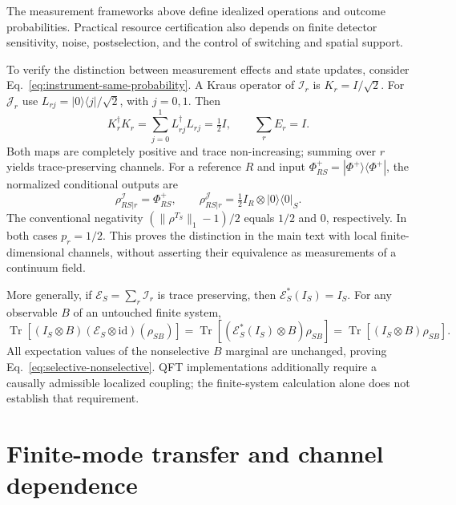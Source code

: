 \documentclass[pdflatex,sn-mathphys-num]{sn-jnl}
\newcommand{\Tr}{\operatorname{Tr}}
\begin{document}
The measurement frameworks above define idealized operations and outcome probabilities. Practical resource certification also depends on finite detector sensitivity, noise, postselection, and the control of switching and spatial support.




To verify the distinction between measurement effects and state updates, consider Eq.~\eqref{eq:instrument-same-probability}. A Kraus operator of $\mathcal I_r$ is $K_r=I/\sqrt2$. For $\mathcal J_r$ use $L_{rj}=|0\rangle\langle j|/\sqrt2$, with $j=0,1$. Then
\begin{equation}
K_r^\dagger K_r=\sum_{j=0}^1L_{rj}^\dagger L_{rj}=\tfrac12I,
\qquad \sum_r E_r=I.
\end{equation}
Both maps are completely positive and trace non-increasing; summing over $r$ yields trace-preserving channels. For a reference $R$ and input $\Phi^+_{RS}=|\Phi^+\rangle\langle\Phi^+|$, the normalized conditional outputs are
\begin{equation}
\rho^{\mathcal I}_{RS|r}=\Phi^+_{RS},\qquad
\rho^{\mathcal J}_{RS|r}=\tfrac12 I_R\otimes|0\rangle\langle0|_S.
\end{equation}
The conventional negativity $(\|\rho^{T_S}\|_1-1)/2$ equals $1/2$ and $0$, respectively. In both cases $p_r=1/2$. This proves the distinction in the main text with local finite-dimensional channels, without asserting their equivalence as measurements of a continuum field.

More generally, if $\mathcal E_S=\sum_r\mathcal I_r$ is trace preserving, then $\mathcal E_S^*(I_S)=I_S$. For any observable $B$ of an untouched finite system,
\begin{equation}
\Tr[(I_S\otimes B)(\mathcal E_S\otimes\mathrm{id})(\rho_{SB})]
=\Tr[(\mathcal E_S^*(I_S)\otimes B)\rho_{SB}]
=\Tr[(I_S\otimes B)\rho_{SB}].
\end{equation}
All expectation values of the nonselective $B$ marginal are unchanged, proving Eq.~\eqref{eq:selective-nonselective}. QFT implementations additionally require a causally admissible localized coupling; the finite-system calculation alone does not establish that requirement.



\section{Finite-mode transfer and channel dependence}
\label{app:finite-mode-transfer}
\end{document}
